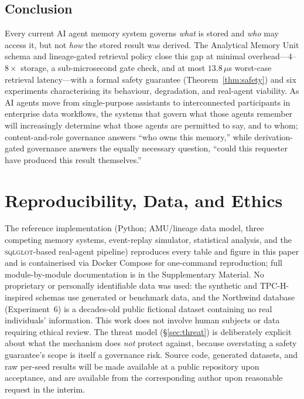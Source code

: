 \documentclass[nolineno]{ieeeaccess}
\begin{document}
\subsection{Conclusion}

Every current AI agent memory system governs \emph{what} is stored and
\emph{who} may access it, but not \emph{how} the stored result was derived.
The Analytical Memory Unit schema and lineage-gated retrieval policy close
this gap at minimal overhead---$4$--$8\times$ storage, a sub-microsecond
gate check, and at most $13.8\,\mu$s worst-case retrieval latency---with a
formal safety guarantee (Theorem~\ref{thm:safety}) and six experiments
characterising its behaviour, degradation, and real-agent viability.
As AI agents move from single-purpose assistants to interconnected
participants in enterprise data workflows, the systems that govern what
those agents remember will increasingly determine what those agents are
permitted to say, and to whom; content-and-role governance answers ``who
owns this memory,'' while derivation-gated governance answers the equally
necessary question, ``could this requester have produced this result
themselves.''

\section{Reproducibility, Data, and Ethics}
\label{sec:repro}

The reference implementation (Python; AMU/lineage data model, three
competing memory systems, event-replay simulator, statistical analysis, and
the \textsc{sqlglot}-based real-agent pipeline) reproduces every table and
figure in this paper and is containerised via Docker Compose for
one-command reproduction; full module-by-module documentation is in the
Supplementary Material.
No proprietary or personally identifiable data was used: the synthetic and
TPC-H-inspired schemas use generated or benchmark data, and the Northwind
database (Experiment~6) is a decades-old public fictional dataset
containing no real individuals' information.
This work does not involve human subjects or data requiring ethical review.
The threat model (\S\ref{sec:threat}) is deliberately explicit about what
the mechanism does \emph{not} protect against, because overstating a safety
guarantee's scope is itself a governance risk.
Source code, generated datasets, and raw per-seed results will be made
available at a public repository upon acceptance, and are available from
the corresponding author upon reasonable request in the interim.
\end{document}
